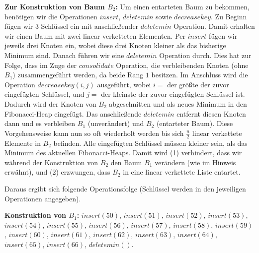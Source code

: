 \documentclass{article}
\begin{document}
\textbf{Zur Konstruktion von Baum $B_2$:} \newline
Um einen entarteten Baum zu bekommen, ben{\"o}tigen wir die Operationen $insert$,
$deletemin$ sowie $decreasekey$. Zu Beginn f{\"u}gen wir $3$ Schl{\"u}ssel ein
mit anschlie{\ss}ender $deletemin$ Operation. Damit erhalten wir einen Baum mit
zwei linear verketteten Elementen. Per $insert$ f{\"u}gen wir jeweils drei Knoten
ein, wobei diese drei Knoten kleiner als das bisherige Minimum sind. Danach
f{\"u}hren wir eine $deletemin$ Operation durch. Dies hat zur Folge, dass im Zuge
der $consolidate$ Operation, die verbleibenden Knoten (ohne $B_1$)
zusammengef{\"u}hrt werden, da beide Rang $1$ besitzen. Im Anschluss wird die
Operation $decreasekey(i, j)$ ausgef{\"u}hrt, wobei $i =$ der gr{\"o}{\ss}te der
zuvor eingef{\"u}gten Schl{\"u}ssel, und $j = $ der kleinste der zuvor
eingef{\"u}gten Schl{\"u}ssel ist. Dadurch wird der Knoten von $B_2$ abgeschnitten
und als neues Minimum in den Fibonacci-Heap eingef{\"u}gt. Das anschlie{\ss}ende
$deletemin$ entfernt diesen Knoten dann und es verbleiben $B_1$ (unver{\"a}ndert)
und $B_2$ (entarteter Baum). Diese Vorgehensweise kann nun so oft wiederholt
werden bis sich $\frac{n}{2}$ linear verkettete Elemente in $B_2$ befinden. Alle
eingef{\"u}gten Schl{\"u}ssel m{\"u}ssen kleiner sein, als das Minimum des
aktuellen Fibonacci-Heaps. Damit wird (1) verhindert, dass wir w{\"a}hrend der
Konstruktion von $B_2$ den Baum $B_1$ ver{\"a}ndern (wie im Hinweis erw{\"a}hnt),
und (2) erzwungen, dass $B_2$ in eine linear verkettete Liste entartet.

\clearpage

Daraus ergibt sich folgende Operationsfolge (Schl{\"u}ssel werden in den
jeweiligen Operationen angegeben).

\textbf{Konstruktion von $B_1$:} \newline
$insert(50)$, $insert(51)$, $insert(52)$, $insert(53)$, $insert(54)$, \newline
$insert(55)$, $insert(56)$, $insert(57)$, $insert(58)$, $insert(59)$, \newline
$insert(60)$, $insert(61)$, $insert(62)$, $insert(63)$, $insert(64)$, \newline
$insert(65)$, $insert(66)$, $deletemin()$.
\end{document}
